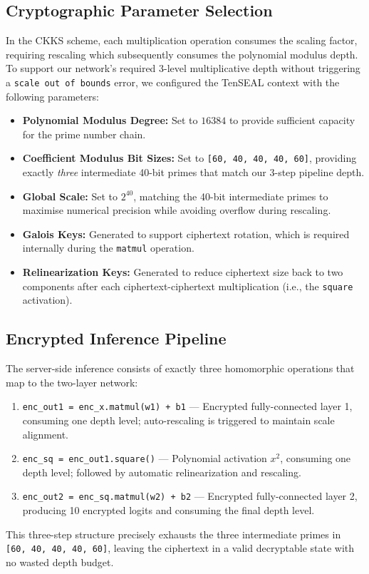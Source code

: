 \documentclass[runningheads]{llncs}
\begin{document}
\subsection{Cryptographic Parameter Selection}
In the CKKS scheme, each multiplication operation consumes the scaling factor, requiring rescaling which subsequently consumes the polynomial modulus depth. To support our network's required 3-level multiplicative depth without triggering a \texttt{scale out of bounds} error, we configured the TenSEAL context with the following parameters:
\begin{itemize}
    \item \textbf{Polynomial Modulus Degree:} Set to $16384$ to provide sufficient capacity for the prime number chain.
    \item \textbf{Coefficient Modulus Bit Sizes:} Set to \texttt{[60, 40, 40, 40, 60]}, providing exactly \textit{three} intermediate 40-bit primes that match our 3-step pipeline depth.
    \item \textbf{Global Scale:} Set to $2^{40}$, matching the 40-bit intermediate primes to maximise numerical precision while avoiding overflow during rescaling.
    \item \textbf{Galois Keys:} Generated to support ciphertext rotation, which is required internally during the \texttt{matmul} operation.
    \item \textbf{Relinearization Keys:} Generated to reduce ciphertext size back to two components after each ciphertext-ciphertext multiplication (i.e., the \texttt{square} activation).
\end{itemize}

\subsection{Encrypted Inference Pipeline}
The server-side inference consists of exactly three homomorphic operations that map to the two-layer network:
\begin{enumerate}
    \item \texttt{enc\_out1 = enc\_x.matmul(w1) + b1} --- Encrypted fully-connected layer 1, consuming one depth level; auto-rescaling is triggered to maintain scale alignment.
    \item \texttt{enc\_sq = enc\_out1.square()} --- Polynomial activation $x^2$, consuming one depth level; followed by automatic relinearization and rescaling.
    \item \texttt{enc\_out2 = enc\_sq.matmul(w2) + b2} --- Encrypted fully-connected layer 2, producing 10 encrypted logits and consuming the final depth level.
\end{enumerate}
This three-step structure precisely exhausts the three intermediate primes in \texttt{[60,\,40,\,40,\,40,\,60]}, leaving the ciphertext in a valid decryptable state with no wasted depth budget.
\end{document}
